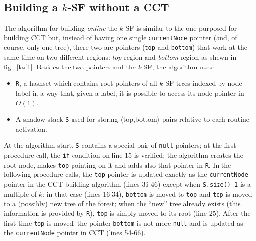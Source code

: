 \documentclass[a4paper,11pt]{report}
\begin{document}
\subsection{Building a $k$-SF without a CCT}

The algorithm for building \emph{online} the $k$-SF is similar to the one purposed for building CCT but, instead of having 
one single \verb|currentNode| pointer (and, of course, only one tree), there two are pointers (\verb|top| and \verb|bottom|) that work at the same time on two different regions: \emph{top} region and \emph{bottom} region as shown in fig.~\ref{ksf1}.
Besides the two pointers and the $k$-SF, the algorithm uses:

\begin{itemize}
\item \verb|R|, a hashset which contains root pointers of all $k$-SF trees indexed by node label in a way that, given a label, it is possible to access its node-pointer in $O(1)$.

\item A shadow stack \verb|S| used for storing $\langle$top,bottom$\rangle$ pairs relative to each routine activation. 
\end{itemize}

At the algorithm start, \verb|S| contains a special pair of \verb|null| pointers; 
at the first procedure call, the \verb|if| condition on line 15 is verified:
the algorithm creates the root-node, makes \verb|top| pointing on it and adds also that pointer in \verb|R|. In the following procedure calls, the \verb|top| pointer is updated exactly as the \verb|currentNode| pointer in the CCT building algorithm (lines 36-46) except when \verb|S.size()-1| is a multiple of $k$: in that case (lines 16-34), \verb|bottom| is moved to \verb|top| and \verb|top| is moved to a (possibly) new tree of the forest; when the ``new'' tree already exists (this information is provided by \verb|R|), \verb|top| is simply moved to its root (line 25). After the first time \verb|top| is moved, the pointer \verb|bottom| is not more \verb|null| and is updated as the \verb|currentNode| pointer in CCT (lines 54-66). 
\end{document}
